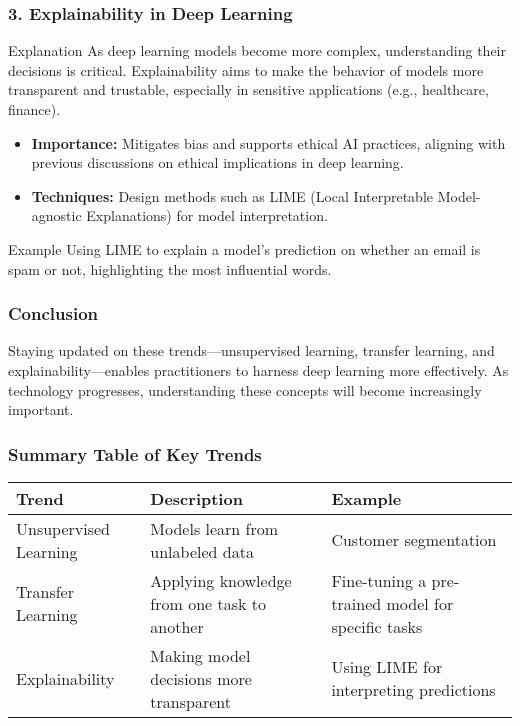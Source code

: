 \documentclass[aspectratio=169]{beamer}
\begin{document}
\begin{frame}[fragile]
    \frametitle{3. Explainability in Deep Learning}
    \begin{block}{Explanation}
        As deep learning models become more complex, understanding their decisions is critical. Explainability aims to make the behavior of models more transparent and trustable, especially in sensitive applications (e.g., healthcare, finance).
    \end{block}
    
    \begin{itemize}
        \item \textbf{Importance:} Mitigates bias and supports ethical AI practices, aligning with previous discussions on ethical implications in deep learning.
        \item \textbf{Techniques:} Design methods such as LIME (Local Interpretable Model-agnostic Explanations) for model interpretation.
    \end{itemize}
    
    \begin{block}{Example}
        Using LIME to explain a model's prediction on whether an email is spam or not, highlighting the most influential words.
    \end{block}
\end{frame}

\begin{frame}[fragile]
    \frametitle{Conclusion}
    Staying updated on these trends—unsupervised learning, transfer learning, and explainability—enables practitioners to harness deep learning more effectively. As technology progresses, understanding these concepts will become increasingly important.
\end{frame}

\begin{frame}[fragile]
    \frametitle{Summary Table of Key Trends}
    \begin{table}[ht]
        \centering
        \begin{tabular}{|l|l|l|}
            \hline
            \textbf{Trend} & \textbf{Description} & \textbf{Example} \\ \hline
            Unsupervised Learning & Models learn from unlabeled data & Customer segmentation \\ \hline
            Transfer Learning & Applying knowledge from one task to another & Fine-tuning a pre-trained model for specific tasks \\ \hline
            Explainability & Making model decisions more transparent & Using LIME for interpreting predictions \\ \hline
        \end{tabular}
    \end{table}
\end{frame}
\end{document}
